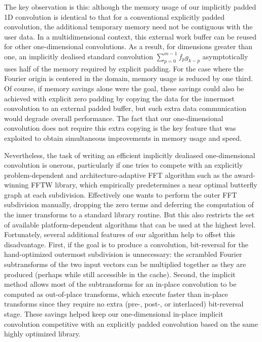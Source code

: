 \documentclass[final]{siamltex}
\begin{document}
The key observation is this: although the memory usage of our implicitly
padded 1D convolution is identical to that for a conventional explicitly
padded convolution, the additional temporary memory need not be contiguous
with the user data.  In a multidimensional context, this external work
buffer can be reused for other one-dimensional convolutions.
As a result, for dimensions greater than one,
an implicitly dealised standard convolution $\sum_{p=0}^{m-1} f_p g_{k-p}$
asymptotically uses half of the
memory required by explicit padding. For the case where the Fourier origin is
centered in the domain, memory usage is reduced by one third.
Of course, if memory savings alone were the goal, these savings could
also be achieved with explicit zero padding by copying the data for the
innermost convolution to an external padded buffer, but such extra data
communication would degrade overall performance. The fact that our
one-dimensional convolution does not require this extra copying is the key
feature that was exploited to obtain simultaneous improvements in memory
usage and speed.

Nevertheless, the task of writing an efficient implicitly dealiased
one-dimensional convolution is onerous, particularly if one tries to
compete with an explicitly problem-dependent and architecture-adaptive
FFT algorithm such as the award-winning FFTW \cite{Frigo05} library, which
empirically predetermines a near optimal butterfly graph
at each subdivision. Effectively one wants to perform
the outer FFT subdivision manually, dropping the zero terms and
deferring the computation of the inner transforms to a standard library
routine. But this also restricts the set of available platform-dependent
algorithms that can be used at the highest level. Fortunately, several 
additional features of our algorithm help to offset this disadvantage. First, if
the goal is to  produce a convolution, bit-reversal for the hand-optimized
outermost subdivision is unnecessary: the scrambled Fourier subtransforms of the
two input vectors can be multiplied together as they are produced
(perhaps while still accessible in the cache). Second, the implicit
method allows most of the subtransforms for an in-place convolution to
be computed as out-of-place transforms, which execute faster than
in-place transforms since they require no extra (pre-, post-, or
interlaced) bit-reversal stage.  These savings helped keep our
one-dimensional in-place implicit convolution competitive with an
explicitly padded convolution based on the same highly optimized
library.
\end{document}
